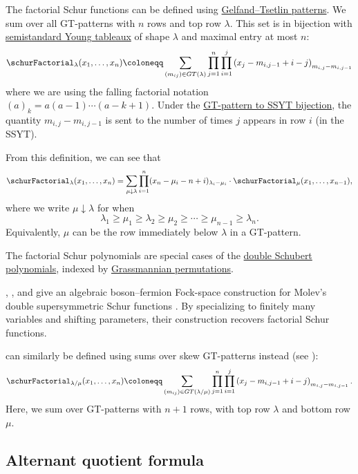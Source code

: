 The factorial Schur functions can be defined using
\hyperref[gtpatterns]{Gelfand--Tsetlin patterns}.
We sum over all GT-patterns with $n$ rows and top row $\lambda$.
This set is in bijection with \hyperref[semistandardYoungTableau]{semistandard
Young tableaux} of shape $\lambda$ and maximal entry at most $n$:
\[
 \schurFactorial_\lambda(x_1,\dotsc,x_n) \coloneqq
 \sum_{(m_{ij}) \in GT(\lambda)} \prod_{j=1}^n \prod_{i=1}^j
 \left( x_j - m_{i,j-1} + i-j \right)_{m_{i,j}-m_{i,j-1}}
\]
where we are using the falling factorial notation $(a)_k = a(a-1)\dotsm (a-k+1)$.
Under the \hyperref[gtpatternsAsSSYT]{GT-pattern to SSYT bijection}, the
quantity $m_{i,j}-m_{i,j-1}$ is sent
to the number of times $j$ appears in row $i$ (in the SSYT).

From this definition, we can see that 
\[
 \schurFactorial_\lambda(x_1,\dotsc,x_n) =
 \sum_{\mu \downarrow \lambda} \prod_{i=1}^n
 (x_n - \mu_i - n +i  )_{\lambda_i - \mu_i} \cdot
 \schurFactorial_\mu(x_1,\dotsc,x_{n-1}),
\]
where we write $\mu \downarrow \lambda$ for when 
\[
 \lambda_1 \geq \mu_1 \geq \lambda_2 \geq \mu_2 \geq \dotsb \geq \mu_{n-1} \geq \lambda_n.
\]
Equivalently, $\mu$ can be the row immediately below $\lambda$ in a GT-pattern.

The factorial Schur polynomials are special cases of the
\hyperref[schubertDouble]{double Schubert polynomials}, indexed by
\hyperref[grassmannianPermutation]{Grassmannian permutations}.

, , and 
give an algebraic boson--fermion Fock-space construction for Molev's double
supersymmetric Schur functions \cite{BumpHardtScrimshaw2025x}.  By
specializing to finitely many variables and shifting parameters, their
construction recovers factorial Schur functions.


\label{skewFactorialSchurFunction}
can similarly be defined using sums over skew GT-patterns instead
(see \cite{ChenLouck1993}): 
\[
 \schurFactorial_{\lambda/\mu}(x_1,\dotsc,x_n) \coloneqq
 \sum_{(m_{ij}) \in GT(\lambda/\mu)} \prod_{j=1}^n \prod_{i=1}^j
 \left( x_j - m_{i,j-1} + i-j \right)_{m_{i,j}-m_{i,j-1}}.
\]
Here, we sum over GT-patterns with $n+1$ rows, with top row $\lambda$ and bottom row $\mu$.


\subsection[schurFactorialAlternant]{Alternant quotient formula}

